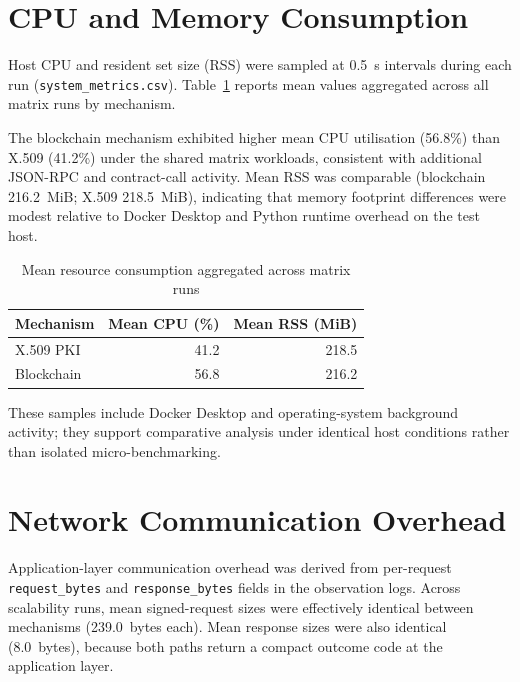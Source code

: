 
\section{CPU and Memory Consumption}
\label{sec:ch5-resources}

Host CPU and resident set size (RSS) were sampled at 0.5~s intervals during each run (\texttt{system\_metrics.csv}). Table~\ref{tab:ch5-resources} reports mean values aggregated across all matrix runs by mechanism.

The blockchain mechanism exhibited higher mean CPU utilisation (56.8\%) than X.509 (41.2\%) under the shared matrix workloads, consistent with additional JSON-RPC and contract-call activity. Mean RSS was comparable (blockchain 216.2~MiB; X.509 218.5~MiB), indicating that memory footprint differences were modest relative to Docker Desktop and Python runtime overhead on the test host.

\begin{table}[htbp]
    \centering
    \caption{Mean resource consumption aggregated across matrix runs}
    \label{tab:ch5-resources}
    \begin{tabular}{|l|r|r|}
        \hline
        \textbf{Mechanism} & \textbf{Mean CPU (\%)} & \textbf{Mean RSS (MiB)} \\
        \hline
        X.509 PKI & 41.2 & 218.5 \\
        Blockchain & 56.8 & 216.2 \\
        \hline
    \end{tabular}
\end{table}

These samples include Docker Desktop and operating-system background activity; they support comparative analysis under identical host conditions rather than isolated micro-benchmarking.

\section{Network Communication Overhead}
\label{sec:ch5-comm}

Application-layer communication overhead was derived from per-request \texttt{request\_bytes} and \texttt{response\_bytes} fields in the observation logs. Across scalability runs, mean signed-request sizes were effectively identical between mechanisms (239.0~bytes each). Mean response sizes were also identical (8.0~bytes), because both paths return a compact outcome code at the application layer.

